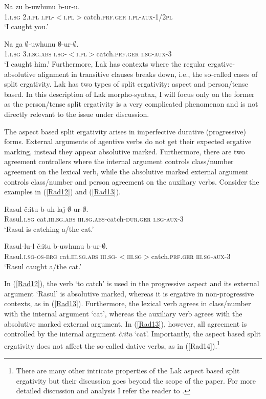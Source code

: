 \documentclass[output=paper]{langscibook}
\begin{document}
\ea\label{Rad10}
\gll Na zu b-uwhunu b-ur-u.\\
\textsc{1.i.sg}  \textsc{2.i.pl} \textsc{i.pl-$<$i.pl$>$}catch.\textsc{prf.ger} \textsc{i.pl-aux-1/2pl}\\
\glt ‘I caught you.’
\z

\ea\label{Rad11}
\gll Na ga $∅$-uwhunu $∅$-ur-$∅$.\\
\textsc{1.i.sg}	\textsc{3.i.sg.abs} \textsc{i.sg-$<$i.pl$>$}catch.\textsc{prf.ger} \textsc{i.sg-aux-3}\\
\glt ‘I caught him.’
\z
Furthermore, Lak has contexts where the regular ergative-absolutive alignment in transitive clauses breaks down, i.e., the so-called cases of split ergativity. Lak has two types of split ergativity: aspect and person/tense based. In this description of Lak morpho-syntax, I will focus only on the former as the person/tense split ergativity is a very complicated phenomenon and is not directly relevant to the issue under discussion.

The aspect based split ergativity arises in imperfective durative (progressive) forms. External arguments of agentive verbs do not get their expected ergative marking, instead they appear absolutive marked. Furthermore, there are two agreement controllers where the internal argument controls class/number agreement on the lexical verb, while the absolutive marked external argument controls class/number and person agreement on the auxiliary verbs. Consider the examples in (\ref{Rad12}) and (\ref{Rad13}).

\ea\label{Rad12}
\gll Rasul č:itu b-uh-laj $∅$-ur-$∅$.\\
Rasul.\textsc{i.sg} cat.\textsc{iii.sg.abs} \textsc{iii.sg.abs}-catch-\textsc{dur.ger} \textsc{i.sg-aux-3}\\
\glt ‘Rasul is catching a/the cat.’
\z

\ea\label{Rad13}
\gll Rasul-lu-l č:itu b-uwhunu b-ur-$∅$.\\
Rasul.\textsc{i.sg-os-erg} cat.\textsc{iii.sg.abs} \textsc{iii.sg-$<$iii.sg$>$}catch.\textsc{prf.ger} \textsc{iii.sg-aux-3}\\
\glt ‘Rasul caught a/the cat.’
\z

In (\ref{Rad12}), the verb ‘to catch’ is used in the progressive aspect and its external argument ‘Rasul’ is absolutive marked, whereas it is ergative in non-progressive contexts, as in (\ref{Rad13}). Furthermore, the lexical verb agrees in class/number with the internal argument ‘cat’, whereas the auxiliary verb agrees with the absolutive marked external argument. In (\ref{Rad13}), however, all agreement is controlled by the internal argument \textit{č:itu} ‘cat’. Importantly, the aspect based split ergativity does not affect the so-called dative verbs, as in (\ref{Rad14}).\footnote{There are many other intricate properties of the Lak aspect based split ergativity but their discussion goes beyond the scope of the paper. For more detailed discussion and analysis I refer the reader to \citet{GagliardiRadkevich2014}.} 
\end{document}
